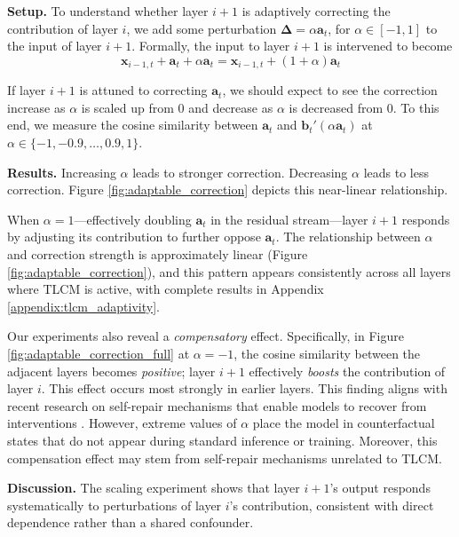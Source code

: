 \textbf{Setup.} To understand whether layer $i+1$ is adaptively correcting the contribution of layer $i$, we add some perturbation $\mathbf{\Delta} = \alpha \mathbf{a}_t$, for $\alpha \in [-1, 1]$ to the input of layer $i+1$. Formally, the input to layer $i+1$ is intervened to become $$\mathbf{x}_{i-1,t} +  \mathbf{a}_t + \alpha \mathbf{a}_t = \mathbf{x}_{i-1,t} + (1 + \alpha) \mathbf{a}_t$$

If layer $i+1$ is attuned to correcting $\mathbf{a}_t$, we should expect to see the correction increase as $\alpha$ is scaled up from $0$ and decrease as $\alpha$ is decreased from $0$. To this end, we measure the cosine similarity between $\mathbf{a}_t$ and $\mathbf{b}_t'(\alpha\mathbf{a}_t)$ at $\alpha \in \{-1, -0.9, \ldots, 0.9, 1\}$.

\textbf{Results.}
Increasing $\alpha$ leads to stronger correction. Decreasing $\alpha$ leads to less correction. Figure \ref{fig:adaptable_correction} depicts this near-linear relationship.

When $\alpha = 1$---effectively doubling $\mathbf{a}_t$ in the residual stream---layer $i+1$ responds by adjusting its contribution to further oppose $\mathbf{a}_t$. The relationship between $\alpha$ and correction strength is approximately linear (Figure \ref{fig:adaptable_correction}), and this pattern appears consistently across all layers where TLCM is active, with complete results in Appendix \ref{appendix:tlcm_adaptivity}.

Our experiments also reveal a \textit{compensatory} effect. Specifically, in Figure \ref{fig:adaptable_correction_full} at $\alpha = -1$, the cosine similarity between the adjacent layers becomes \textit{positive}; layer $i+1$ effectively \textit{boosts} the contribution of layer $i$. This effect occurs most strongly in earlier layers. This finding aligns with recent research on self-repair mechanisms that enable models to recover from interventions \citep{mcgrath2023hydraeffectemergentselfrepair}. However, extreme values of $\alpha$ place the model in counterfactual states that do not appear during standard inference or training. Moreover, this compensation effect may stem from self-repair mechanisms unrelated to TLCM.

\textbf{Discussion.} The scaling experiment shows that layer $i+1$'s output responds systematically to perturbations of layer $i$'s contribution, consistent with direct dependence rather than a shared confounder.

